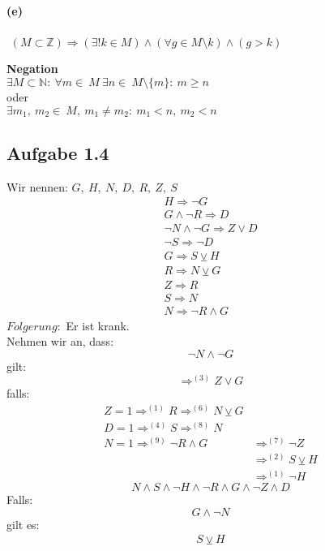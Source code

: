 \paragraph{(e)}
\begin{solution}
$ $\newline
$(M\subset\mathbb{Z})\Rightarrow(\exists!k\in M)\wedge(\forall g\in M\setminus k)\wedge(g>k)$
\end{solution}
\textbf{Negation}\\
$\exists M\subset\mathbb{N}:\ \forall m\in\ M\ \exists n\in\ M\setminus\{m\}:\ m\geq n$\\
oder\\
$\exists m_1,\ m_2\in\ M,\ m_1\neq m_2:\ m_1<n,\ m_2<n$

\newpage

\subsection{Aufgabe 1.4}
Wir nennen: $G,\ H,\ N,\ D,\ R,\ Z,\ S$\\
\begin{align}
H\Rightarrow \neg G\\
G\wedge \neg R\Rightarrow D\\
\neg N\wedge \neg G\Rightarrow Z\vee D\\
\neg S\Rightarrow\neg D\\
G\Rightarrow S\veebar H\\
R\Rightarrow N\veebar G\\
Z\Rightarrow R\\
S\Rightarrow N\\
N\Rightarrow\neg R\wedge G
\end{align}
$Folgerung:$ Er ist krank.\\
\null
Nehmen wir an, dass:\\
\begin{equation*}
\neg N\wedge \neg G
\end{equation*}
gilt:\\
\begin{equation*}
\Rightarrow^{(3)} Z\vee G
\end{equation*}
falls:\\
\begin{align*}
Z=1\Rightarrow^{(1)}R\Rightarrow^{(6)}N\veebar G\\
D=1\Rightarrow^{(4)}S\Rightarrow^{(8)}N\\
N=1\Rightarrow^{(9)}\neg R\wedge G &\Rightarrow^{(7)}\neg Z\\
&\Rightarrow^{(2)}S\veebar H\\
&\Rightarrow^{(1)}\neg	H
\end{align*}
\begin{equation*}
N\wedge S\wedge\neg H\wedge\neg R\wedge G\wedge\neg Z\wedge D
\end{equation*}
Falls:
\begin{equation*}
G\wedge\neg N
\end{equation*}
gilt es:
\begin{align*}
S\veebar H\\
\end{align*}

